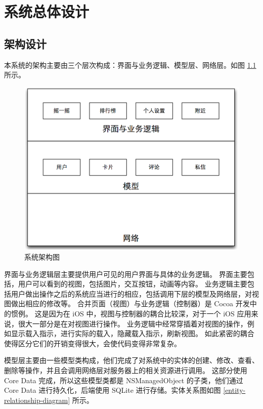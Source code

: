 \chapter{系统总体设计}
\label{system-design}

\section{架构设计}

本系统的架构主要由三个层次构成：界面与业务逻辑、模型层、网络层。如图 \ref{architecture} 所示。

\begin{figure}[h!]
    \centering
    \includegraphics[width=400pt]{figure/architecture.png}
    \caption{系统架构图}
    \label{architecture}
\end{figure}

界面与业务逻辑层主要提供用户可见的用户界面与具体的业务逻辑。
界面主要包括，用户可以看到的视图，包括图片，交互按钮，动画等内容。
业务逻辑主要包括用户做出操作之后的系统应当进行的相应，包括调用下层的模型及网络层，对视图做出相应的修改等。
合并页面（视图）与业务逻辑（控制器）是 Cocoa 开发中的惯例。
这是因为在 iOS 中，视图与控制器的耦合比较深，对于一个 iOS 应用来说，很大一部分是在对视图进行操作。
业务逻辑中经常穿插着对视图的操作，例如显示载入指示，进行实际的载入，隐藏载入指示，刷新视图。
如此紧密的耦合使得区分它们的开销变得很大，会使代码变得非常复杂。

模型层主要由一些模型类构成，他们完成了对系统中的实体的创建、修改、查看、删除等操作，并且会调用网络层对服务器上的相关资源进行调用。
这部分使用 Core Data 完成，所以这些模型类都是 NSManagedObject 的子类，他们通过 Core Data 进行持久化，后端使用 SQLite 进行存储。实体关系图如图 \ref{entity-relationship-diagram} 所示。

